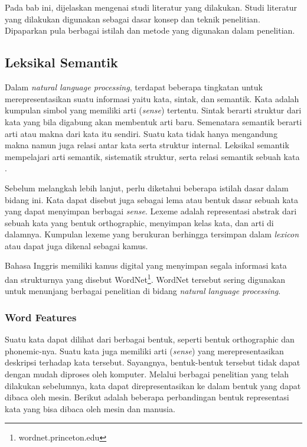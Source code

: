 \chapter{\babDua}
Pada bab ini, dijelaskan mengenai studi literatur yang dilakukan. Studi literatur yang dilakukan digunakan sebagai dasar konsep dan teknik penelitian. Dipaparkan pula berbagai istilah dan metode yang digunakan dalam penelitian.


\section{Leksikal Semantik}
Dalam \textit{natural language processing}, terdapat beberapa tingkatan untuk merepresentasikan suatu informasi yaitu kata, sintak, dan semantik. Kata adalah kumpulan simbol yang memiliki arti (\textit{sense}) tertentu. Sintak berarti struktur dari kata yang bila digabung akan membentuk arti baru. Semenatara semantik berarti arti atau makna dari kata itu sendiri. Suatu kata tidak hanya mengandung makna namun juga relasi antar kata serta struktur internal. Leksikal semantik mempelajari arti semantik, sistematik struktur, serta relasi semantik sebuah kata \citep{jurafsky2000speech}. %

Sebelum melangkah lebih lanjut, perlu diketahui beberapa istilah dasar dalam bidang ini. Kata dapat disebut juga sebagai lema atau bentuk dasar sebuah kata yang dapat menyimpan berbagai \textit{sense}. Lexeme adalah representasi abstrak dari sebuah kata yang bentuk orthographic, menyimpan kelas kata, dan arti di dalamnya. Kumpulan lexeme yang berukuran berhingga tersimpan dalam \textit{lexicon} atau dapat juga dikenal sebagai kamus. 

Bahasa Inggris memiliki kamus digital yang menyimpan segala informasi kata dan strukturnya yang disebut WordNet\footnote{wordnet.princeton.edu}. WordNet tersebut sering digunakan untuk menunjang berbagai penelitian di bidang \textit{natural language processing}. 

\subsection{Word Features}
Suatu kata dapat dilihat dari berbagai bentuk, seperti bentuk orthographic dan phonemic-nya. Suatu kata juga memiliki arti (\textit{sense}) yang merepresentasikan deskripsi terhadap kata tersebut. Sayangnya, bentuk-bentuk tersebut tidak dapat dengan mudah diproses oleh komputer. Melalui berbagai penelitian yang telah dilakukan sebelumnya, kata dapat direpresentasikan ke dalam bentuk yang dapat dibaca oleh mesin. Berikut adalah beberapa perbandingan bentuk representasi kata yang bisa dibaca oleh mesin dan manusia.

